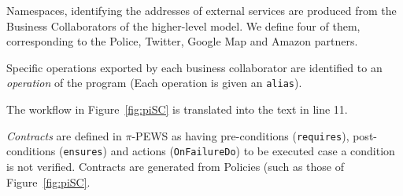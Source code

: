 \begin{numtrivlist}
\item Namespaces, identifying the addresses of external services are produced from the Business Collaborators of the higher-level model. 
We define four of them, corresponding to the Police, Twitter, Google Map and Amazon partners.
\item Specific operations exported by each business collaborator are identified to an \textit{operation} of the program (Each operation is given an \texttt{alias}).
\item The workflow in Figure~\ref{fig:piSC} is translated into the text in line 11.
\item \textit{Contracts} are defined in $\pi$-PEWS as having pre-conditions (\texttt{requires}), post-conditions (\texttt{ensures}) and actions (\texttt{OnFailureDo}) to be executed case a condition is not verified. 
Contracts are generated from Policies (such as those of Figure~\ref{fig:piSC}.
\end{numtrivlist}



